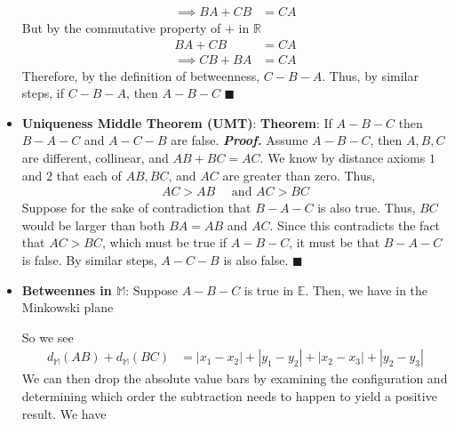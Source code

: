 \documentclass{report}
\begin{document}
\begin{itemize}
\begin{align*}
                \implies BA + CB &= CA
            \end{align*}
            But by the commutative property of $+$ in $\mathbb{R} $
            \begin{align*}
                BA + CB &= CA \\
                \implies CB + BA &= CA 
            \end{align*}
            Therefore, by the definition of betweenness, $C-B-A$. Thus, by similar steps, if $C-B-A$, then $A-B-C$ \hspace*{\fill} $\blacksquare$
        \item \textbf{Uniqueness Middle Theorem (UMT)}:
            \bigbreak \noindent 
            \textbf{Theorem}: If $A-B-C$ then $B-A-C$ and $A-C-B$ are false.
            \bigbreak \noindent 
            \textbf{\textit{Proof.}} Assume $A-B-C$, then $A,B,C$ are different, collinear, and $AB + BC = AC$. We know by distance axioms $1$ and $2$ that each of $AB, BC$, and $AC$ are greater than zero. Thus,
            \begin{align*}
                AC > AB \quad \text{ and } AC > BC
            \end{align*}
            Suppose for the sake of contradiction that $B-A-C$ is also true. Thus, $BC$ would be larger than both $BA=AB$ and $AC$. 
            \bigbreak \noindent 
            Since this contradicts the fact that $AC > BC$, which must be true if $A-B-C$, it must be that $B-A-C$ is false. By similar steps, $A-C-B$ is also false. \hspace*{\fill} $\blacksquare $ 
        \item \textbf{Betweennes in $\mathbb{M}$}: Suppose $A-B-C$ is true in $\mathbb{E}$. Then, we have in the Minkowski plane
            \bigbreak \noindent 
            \begin{figure}[ht]
                \centering
                \label{fig:bet}
            \end{figure}
            \bigbreak \noindent 
            So we see
            \begin{align*}
                d_{\mathbb{M}}(AB) + d_{\mathbb{M}}(BC) &= \left\lvert x_{1} -x_{2} \right\rvert + \left\lvert y_{1} - y_{2} \right\rvert + \left\lvert x_{2} - x_{3} \right\rvert + \left\lvert y_{2} - y_{3} \right\rvert
            \end{align*}
            \bigbreak \noindent 
            We can then drop the absolute value bars by examining the configuration and determining which order the subtraction needs to happen to yield a positive result. We have

\end{itemize}
\end{document}
